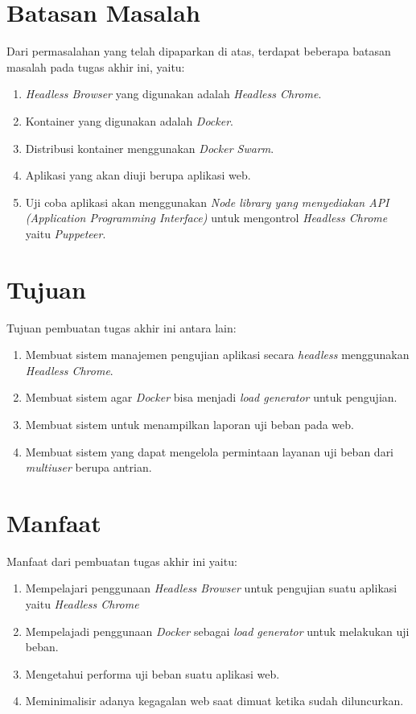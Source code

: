 	\section{Batasan Masalah}
		Dari permasalahan yang telah dipaparkan di atas, terdapat beberapa batasan masalah pada tugas akhir ini, yaitu:
		\begin{enumerate}
			\item \textit{Headless Browser} yang digunakan adalah \textit{Headless Chrome}.
			\item Kontainer yang digunakan adalah \textit{Docker}.
			\item Distribusi kontainer menggunakan \textit{Docker Swarm}.
			\item Aplikasi yang akan diuji berupa aplikasi web.
			\item Uji coba aplikasi akan menggunakan  \textit{Node library yang menyediakan API (Application Programming Interface)} untuk mengontrol \textit{Headless Chrome} yaitu \textit{Puppeteer}.
		\end{enumerate}

	\section{Tujuan}
       	Tujuan pembuatan tugas akhir ini antara lain:
       	\begin{enumerate}
       		\item Membuat sistem manajemen pengujian aplikasi secara \textit{headless} menggunakan \textit{Headless Chrome}.
       		\item Membuat sistem agar \textit{Docker} bisa menjadi \textit{load generator} untuk pengujian.
       		\item Membuat sistem untuk menampilkan laporan uji beban pada web.
       		\item Membuat sistem yang dapat mengelola permintaan layanan uji beban dari \textit{multiuser} berupa antrian.
       	\end{enumerate}
        
	\section{Manfaat}
		Manfaat dari pembuatan tugas akhir ini yaitu:
		\begin{enumerate}
			\item Mempelajari penggunaan \textit{Headless Browser} untuk pengujian suatu aplikasi yaitu \textit{Headless Chrome}
			\item Mempelajadi penggunaan \textit{Docker} sebagai \textit{load generator} untuk melakukan uji beban.
			\item Mengetahui performa uji beban suatu aplikasi web.
			\item Meminimalisir adanya kegagalan web saat dimuat ketika sudah diluncurkan.
		\end{enumerate}
	
